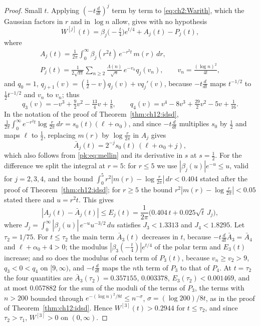 \begin{proof}
Small $t$. Applying $(-t\frac d{dt})^j$ term by term to \eqref{eq:ch2:Warith}, which the Gaussian factors in $r$ and in $\log n$ allow, gives with no hypothesis
\begin{equation}\label{pk:eq:Wjarith}
W^{[j]}(t)=\beta_j\big(-\tfrac t4\big)e^{t/4}+A_j(t)-P_j(t),
\end{equation}
where
\begin{gather*}
A_j(t)=\frac1{2\pi}\int_0^\infty\beta_j(r^2t)\,e^{-r^2t}\,m(r)\,dr,\\
P_j(t)=\frac1{2\sqrt{\pi t}}\sum_{n\ge2}\frac{\Lambda(n)}{\sqrt n}\,e^{-v_n}q_j(v_n),\qquad v_n=\frac{(\log n)^2}{4t},
\end{gather*}
and $q_0=1$, $q_{j+1}(v)=(\frac12-v)q_j(v)+vq_j'(v)$, because $-t\frac d{dt}$ maps $t^{-1/2}$ to $\frac12t^{-1/2}$ and $v_n$ to $v_n$; thus
\[
q_3(v)=-v^3+\tfrac92v^2-\tfrac{13}4v+\tfrac18,\qquad q_4(v)=v^4-8v^3+\tfrac{29}2v^2-5v+\tfrac1{16} .
\]
In the notation of the proof of Theorem~\ref{thm:ch12:idsd}, $\frac1{2\pi}\int_0^\infty e^{-r^2t}\log\frac r{2\pi}\,dr=s_0(t)(\ell+\alpha_0)$, and since $-t\frac d{dt}$ multiplies $s_0$ by $\frac12$ and maps $\ell$ to $\frac12$, replacing $m(r)$ by $\log\frac r{2\pi}$ in $A_j$ gives
\[
\bar A_j(t)=2^{-j}s_0(t)\,(\ell+\alpha_0+j),
\]
which also follows from \eqref{pk:eq:mellin} and its derivative in $s$ at $s=\frac12$. For the difference we split the integral at $r=5$: for $r\le5$ we use $|\beta_j(u)|e^{-u}\le u$, valid for $j=2,3,4$, and the bound $\int_0^5r^2|m(r)-\log\frac r{2\pi}|\,dr<0.404$ stated after the proof of Theorem~\ref{thm:ch12:idsd}; for $r\ge5$ the bound $r^2|m(r)-\log\frac r{2\pi}|<0.05$ stated there and $u=r^2t$. This gives
\[
|A_j(t)-\bar A_j(t)|\le E_j(t)=\frac1{2\pi}\Big(0.404\,t+0.025\sqrt t\,J_j\Big),
\]
where $J_j=\int_0^\infty|\beta_j(u)|\,e^{-u}u^{-3/2}\,du$ satisfies $J_3<1.3313$ and $J_4<1.8295$. Let $\tau_2=1/75$. For $t\le\tau_2$ the main term $\bar A_3(t)$ decreases in $t$, because $-t\frac d{dt}\bar A_3=\bar A_4$ and $\ell+\alpha_0+4>0$; the modulus $|\beta_3(-\frac t4)|e^{t/4}$ of the polar term and $E_3(t)$ increase; and so does the modulus of each term of $P_3(t)$, because $v_n\ge v_2>9$, $q_3<0<q_4$ on $[9,\infty)$, and $-t\frac d{dt}$ maps the $n$th term of $P_3$ to that of $P_4$. At $t=\tau_2$ the four quantities are $\bar A_3(\tau_2)=0.357155$, $0.003378$, $E_3(\tau_2)<0.001469$, and at most $0.057882$ for the sum of the moduli of the terms of $P_3$, the terms with $n>200$ bounded through $e^{-(\log n)^2/8t}\le n^{-\sigma}$, $\sigma=(\log200)/8t$, as in the proof of Theorem~\ref{thm:ch12:idsd}. Hence $W^{[3]}(t)>0.2944$ for $t\le\tau_2$, and since $\tau_2>\tau_1$, $W^{[3]}>0$ on $(0,\infty)$.


\end{proof}
